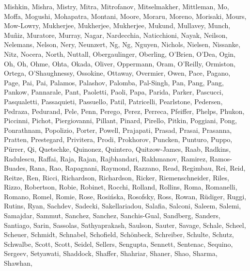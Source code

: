 \documentclass[times,tight]{aastex631}
\begin{document}
\begin{thebibliography}{}
{  {Mishkin}, {Mishra}, {Mistry}, {Mitra}, {Mitrofanov}, {Mitselmakher},
  {Mittleman}, {Mo}, {Moffa}, {Mogushi}, {Mohapatra}, {Montani}, {Moore},
  {Moraru}, {Moreno}, {Morisaki}, {Mours}, {Mow-Lowry}, {Mukherjee},
  {Mukherjee}, {Mukherjee}, {Mukund}, {Mullavey}, {Munch}, {Mu{\~n}iz},
  {Muratore}, {Murray}, {Nagar}, {Nardecchia}, {Naticchioni}, {Nayak},
  {Neilson}, {Nelemans}, {Nelson}, {Nery}, {Neunzert}, {Ng}, {Ng}, {Nguyen},
  {Nichols}, {Nielsen}, {Nissanke}, {Nitz}, {Nocera}, {North}, {Nuttall},
  {Obergaulinger}, {Oberling}, {O'Brien}, {O'Dea}, {Ogin}, {Oh}, {Oh}, {Ohme},
  {Ohta}, {Okada}, {Oliver}, {Oppermann}, {Oram}, {O'Reilly}, {Ormiston},
  {Ortega}, {O'Shaughnessy}, {Ossokine}, {Ottaway}, {Overmier}, {Owen}, {Pace},
  {Pagano}, {Page}, {Pai}, {Pai}, {Palamos}, {Palashov}, {Palomba},
  {Pal-Singh}, {Pan}, {Pang}, {Pang}, {Pankow}, {Pannarale}, {Pant},
  {Paoletti}, {Paoli}, {Papa}, {Parida}, {Parker}, {Pascucci}, {Pasqualetti},
  {Passaquieti}, {Passuello}, {Patil}, {Patricelli}, {Pearlstone}, {Pedersen},
  {Pedraza}, {Pedurand}, {Pele}, {Penn}, {Perego}, {Perez}, {Perreca},
  {Pfeiffer}, {Phelps}, {Phukon}, {Piccinni}, {Pichot}, {Piergiovanni},
  {Pillant}, {Pinard}, {Pirello}, {Pitkin}, {Poggiani}, {Pong}, {Ponrathnam},
  {Popolizio}, {Porter}, {Powell}, {Prajapati}, {Prasad}, {Prasai}, {Prasanna},
  {Pratten}, {Prestegard}, {Privitera}, {Prodi}, {Prokhorov}, {Puncken},
  {Punturo}, {Puppo}, {P{\"u}rrer}, {Qi}, {Quetschke}, {Quinonez}, {Quintero},
  {Quitzow-James}, {Raab}, {Radkins}, {Radulescu}, {Raffai}, {Raja}, {Rajan},
  {Rajbhandari}, {Rakhmanov}, {Ramirez}, {Ramos-Buades}, {Rana}, {Rao},
  {Rapagnani}, {Raymond}, {Razzano}, {Read}, {Regimbau}, {Rei}, {Reid},
  {Reitze}, {Ren}, {Ricci}, {Richardson}, {Richardson}, {Ricker},
  {Riemenschneider}, {Riles}, {Rizzo}, {Robertson}, {Robie}, {Robinet},
  {Rocchi}, {Rolland}, {Rollins}, {Roma}, {Romanelli}, {Romano}, {Romel},
  {Romie}, {Rose}, {Rosi{\'n}ska}, {Rosofsky}, {Ross}, {Rowan}, {R{\"u}diger},
  {Ruggi}, {Rutins}, {Ryan}, {Sachdev}, {Sadecki}, {Sakellariadou}, {Salafia},
  {Salconi}, {Saleem}, {Salemi}, {Samajdar}, {Sammut}, {Sanchez}, {Sanchez},
  {Sanchis-Gual}, {Sandberg}, {Sanders}, {Santiago}, {Sarin}, {Sassolas},
  {Sathyaprakash}, {Saulson}, {Sauter}, {Savage}, {Schale}, {Scheel},
  {Scheuer}, {Schmidt}, {Schnabel}, {Schofield}, {Sch{\"o}nbeck}, {Schreiber},
  {Schulte}, {Schutz}, {Schwalbe}, {Scott}, {Scott}, {Seidel}, {Sellers},
  {Sengupta}, {Sennett}, {Sentenac}, {Sequino}, {Sergeev}, {Setyawati},
  {Shaddock}, {Shaffer}, {Shahriar}, {Shaner}, {Shao}, {Sharma}, {Shawhan},
}
\end{thebibliography}
\end{document}
